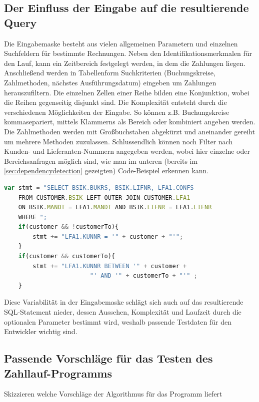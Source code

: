 \subsection{Der Einfluss der Eingabe auf die resultierende Query}
Die Eingabemaske besteht aus vielen allgemeinen Parametern und einzelnen Suchfeldern für bestimmte Rechnungen.
Neben den Identifikationsmerkmalen für den Lauf, kann ein Zeitbereich festgelegt werden, in dem die Zahlungen liegen.
Anschließend werden in Tabellenform Suchkriterien (Buchungskreise, Zahlmethoden, nächstes Ausführungsdatum) eingeben um Zahlungen herauszufiltern.
Die einzelnen Zellen einer Reihe bilden eine Konjunktion, wobei die Reihen gegenseitig disjunkt sind.
Die Komplexität entsteht durch die verschiedenen Möglichkeiten der Eingabe.
So können z.B. Buchungskreise kommasepariert, mittels Klammerns als Bereich oder kombiniert angeben werden.
Die Zahlmethoden werden mit Großbuchstaben abgekürzt und aneinander gereiht um mehrere Methoden zuzulassen.
Schlussendlich können noch Filter nach Kunden- und Lieferanten-Nummern angegeben werden, wobei hier einzelne oder Bereichsanfragen möglich sind, wie man im unteren (bereits im \autoref{sec:dependencydetection} gezeigten) Code-Beispiel erkennen kann.

\begin{lstlisting}[language=JavaScript]
	var stmt = "SELECT BSIK.BUKRS, BSIK.LIFNR, LFA1.CONFS
	FROM CUSTOMER.BSIK LEFT OUTER JOIN CUSTOMER.LFA1
	ON BSIK.MANDT = LFA1.MANDT AND BSIK.LIFNR = LFA1.LIFNR
	WHERE ";
	if(customer && !customerTo){
		stmt += "LFA1.KUNNR = '" + customer + "'";
	}
	if(customer && customerTo){
		stmt += "LFA1.KUNNR BETWEEN '" + customer +
						"' AND '" + customerTo + "'" ;
	}
\end{lstlisting}

Diese Variabilität in der Eingabemaske schlägt sich auch auf das resultierende SQL-Statement nieder, dessen Aussehen, Komplexität und Laufzeit durch die optionalen Parameter bestimmt wird, weshalb passende Testdaten für den Entwickler wichtig sind.

\subsection{Passende Vorschl{\"a}ge f{\"u}r das Testen des Zahllauf-Programms}
Skizzieren welche Vorschläge der Algorithmus für das Programm liefert
